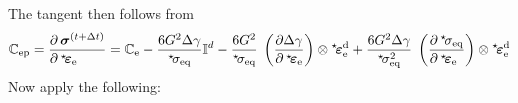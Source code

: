 \documentclass[times,namecite]{goose-article}
\newcommand\leftstar[1]{\hspace*{-.3em}~^\star\!#1}
\begin{document}
The tangent then follows from
\begin{equation}
\mathbb{C}_\mathrm{ep}
=
\frac{
  \partial \, \bm{\sigma}^{(t+\Delta t)} \hfill
}{
  \partial \, \leftstar{\bm{\varepsilon}}_\mathrm{e} \hfill
}
=
\mathbb{C}_\mathrm{e}
- \frac{6 G^2 \Delta \gamma}{\leftstar{\sigma}_\mathrm{eq}} \mathbb{I}^d
- \frac{6 G^2}{\leftstar{\sigma}_\mathrm{eq}} \;
\left( \frac{
  \partial \Delta \gamma \hfill
}{
  \partial \,\leftstar{\bm{\varepsilon}}_\mathrm{e} \hfill
} \right) \otimes
\leftstar{\bm{\varepsilon}}_\mathrm{e}^\mathrm{d}
+ \frac{6 G^2 \Delta \gamma}{\leftstar{\sigma}_\mathrm{eq}^2} \;
\left( \frac{
  \partial \,\leftstar{\sigma}_\mathrm{eq} \hfill
}{
  \partial \,\leftstar{\bm{\varepsilon}}_\mathrm{e} \hfill
} \right) \otimes
\leftstar{\bm{\varepsilon}}_\mathrm{e}^\mathrm{d}
\end{equation}
Now apply the following:
\end{document}
